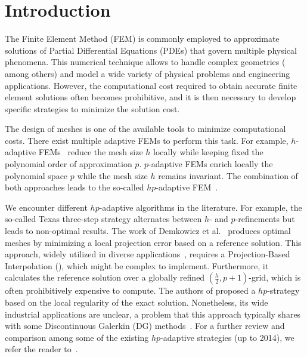 \section{Introduction}
\label{sec:intro}
The Finite Element Method (FEM) is commonly employed to approximate solutions of Partial Differential Equations (PDEs) that govern multiple physical phenomena. This numerical technique allows to handle complex geometries (~\cite{larsson2008partial,johnson2012numerical} among others) and model a wide variety of physical problems and engineering applications. However, the computational cost required to obtain accurate finite element solutions often becomes prohibitive, and it is then necessary to develop specific strategies to minimize the solution cost.

The design of  meshes is one of the available tools to minimize computational costs. There exist multiple adaptive FEMs to perform this task. For example, $h$-adaptive FEMs~\cite{belytschko1993h} reduce the mesh size $h$ locally while keeping fixed the polynomial order of approximation $p$. $p$-adaptive FEMs \cite{babuska1981p} enrich locally the polynomial space $p$ while the mesh size $h$ remains invariant. The combination of both approaches leads to the so-called $hp$-adaptive FEM~\cite{babuvska1981error}.

We encounter different $hp$-adaptive algorithms in the literature. For example, the so-called Texas three-step strategy \cite{oden1995parallel} alternates between $h$- and $p$-refinements but leads to non-optimal results. The work of Demkowicz et al.~\cite{demkowicz2002fully,demkowicz2007computing,demkowicz2008computing} produces optimal meshes by minimizing a local projection error based on a reference solution. This approach, widely utilized in diverse applications~\cite{paszynski2005verification,garcia2007two,pardo2007two,pardo2008pml,gomez2012three,paszynski2012parallel,aramberri2015hp}, requires a Projection-Based Interpolation (), which might be complex to implement. Furthermore, it calculates the reference solution over a globally refined $(\frac{h}{2}, p+1)$-grid, which is often prohibitively expensive to compute. The authors of \cite{ainsworth1998adaptive} proposed a $hp$-strategy based on the local regularity of the exact solution. Nonetheless, its wide industrial applications are unclear, a problem that this approach typically shares with some Discontinuous Galerkin (DG) methods~\cite{houston2002discontinuous,antonietti2013hp}. For a further review and comparison among some of the existing $hp$-adaptive strategies (up to 2014), we refer the reader to~\cite{mitchell2014comparison}.

